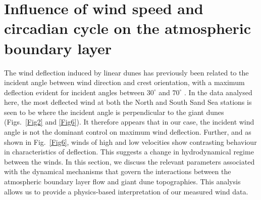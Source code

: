 \section{Influence of wind speed and circadian cycle on the atmospheric boundary layer}
The wind deflection induced by linear dunes has previously been related to the incident angle between wind direction and crest orientation, with a maximum deflection evident for incident angles between $30^{\circ}$ and $70^{\circ}$ \citep{Walker2009, Hesp2015}. In the data analysed here, the most deflected wind at both the North and South Sand Sea stations is seen to be where the incident angle is perpendicular to the giant dunes (Figs.~\ref{Fig2} and \ref{Fig6}). It therefore appears that in our case, the incident wind angle is not the dominant control on maximum wind deflection. Further, and as shown in Fig.~\ref{Fig6}, winds of high and low velocities show contrasting behaviour in characteristics of deflection. This suggests a change in hydrodynamical regime between the winds. In this section, we discuss the relevant parameters associated with the dynamical mechanisms that govern the interactions between the atmospheric boundary layer flow and giant dune topographies. This analysis allows us to provide a physics-based interpretation of our measured wind data.


